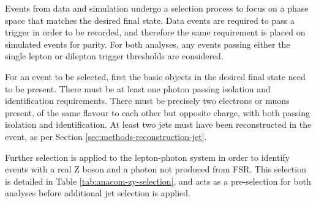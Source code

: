 
Events from data and simulation undergo a selection process to focus on a phase
space that matches the desired final state. Data events are required to pass a
trigger in order to be recorded, and therefore the same requirement is placed on
simulated events for parity. For both analyses, any events passing either the
single lepton or dilepton trigger thresholds are considered.

For an event to be selected, first the basic objects in the desired final state
need to be present. There must be at least one photon passing isolation and
identification requirements. There must be precisely two electrons or muons
present, of the same flavour to each other but opposite charge, with both
passing isolation and identification.
At least two jets must have been
reconstructed in the event, as per Section \ref{sec:methods-reconstruction-jet}.


Further selection is applied to the lepton-photon system in order to identify
events with a real Z boson and a photon not produced from \ac{FSR}. This \Zy selection is
detailed in Table \ref{tab:anacom-zy-selection}, and acts as a pre-selection for
both analyses before additional jet selection is applied.

